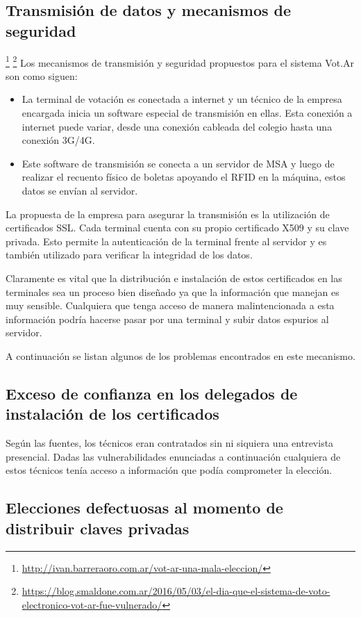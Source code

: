 \subsection{Transmisión de datos y mecanismos de seguridad}
\footnote{\url{http://ivan.barreraoro.com.ar/vot-ar-una-mala-eleccion/}}
\footnote{\url{https://blog.smaldone.com.ar/2016/05/03/el-dia-que-el-sistema-de-voto-electronico-vot-ar-fue-vulnerado/}}
Los mecanismos de transmisión y seguridad propuestos para el sistema Vot.Ar son como siguen:
\begin{itemize}
	\item La terminal de votación es conectada a internet y un técnico de la empresa encargada inicia un software especial de transmisión en ellas. Esta conexión a internet puede variar, desde una conexión cableada del colegio hasta una conexión 3G/4G.
	\item Este software de transmisión se conecta a un servidor de MSA y luego de realizar el recuento físico de boletas apoyando el RFID en la máquina, estos datos se envían al servidor.
\end{itemize}

La propuesta de la empresa para asegurar la transmisión es la utilización de certificados SSL. Cada terminal cuenta con su propio certificado X509 y su clave privada. Esto permite la autenticación de la terminal frente al servidor y es también utilizado para verificar la integridad de los datos.

Claramente es vital que la distribución e instalación de estos certificados en las terminales sea un proceso bien diseñado ya que la información que manejan es muy sensible. Cualquiera que tenga acceso de manera malintencionada a esta información podría hacerse pasar por una terminal y subir datos espurios al servidor.

A continuación se listan algunos de los problemas encontrados en este mecanismo.

\subsection{Exceso de confianza en los delegados de instalación de los certificados}

Según las fuentes, los técnicos eran contratados sin ni siquiera una entrevista presencial. Dadas las vulnerabilidades enunciadas a continuación cualquiera de estos técnicos tenía acceso a información que podía comprometer la elección.

\subsection{Elecciones defectuosas al momento de distribuir claves privadas}

